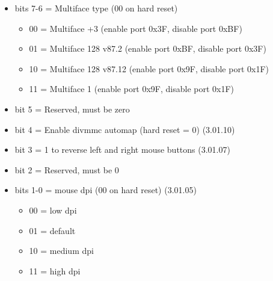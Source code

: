 \begin{itemize}
\item bits 7-6 = Multiface type (00 on hard reset)
  \begin{itemize}
  \item 00 = Multiface +3 (enable port 0x3F, disable port 0xBF)
  \item 01 = Multiface 128 v87.2 (enable port 0xBF, disable port 0x3F)
  \item 10 = Multiface 128 v87.12 (enable port 0x9F, disable port 0x1F)
  \item 11 = Multiface 1 (enable port 0x9F, disable port 0x1F)
  \end{itemize}
\item bit 5 = Reserved, must be zero
\item bit 4 = Enable divmmc automap (hard reset = 0) (3.01.10)
\item bit 3 = 1 to reverse left and right mouse buttons (3.01.07)
\item bit 2 = Reserved, must be 0
\item bits 1-0 = mouse dpi (00 on hard reset) (3.01.05)
  \begin{itemize}
  \item 00 = low dpi
  \item 01 = default
  \item 10 = medium dpi
  \item 11 = high dpi
  \end{itemize}
\end{itemize}

